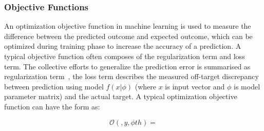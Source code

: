 \subsubsection{Objective Functions}
An optimization objective function in machine learning is used to measure the difference between the predicted outcome and expected outcome, which can be optimized during training phase to increase the accuracy of a prediction. A typical objective function often composes of the regularization term and loss term. The collective efforts to generalize the prediction error is summarised as regularization term~\cite{goodfellow_2015}, the loss term describes the measured off-target discrepancy between prediction using model $f(x|\phi)$ (where $x$ is input vector and $\phi$ is model parameter matrix) and the actual target. A typical optimization objective function can have the form as:

\begin{equation}
    \mathcal{O}(,y,\phi th) = 
\end{equation}